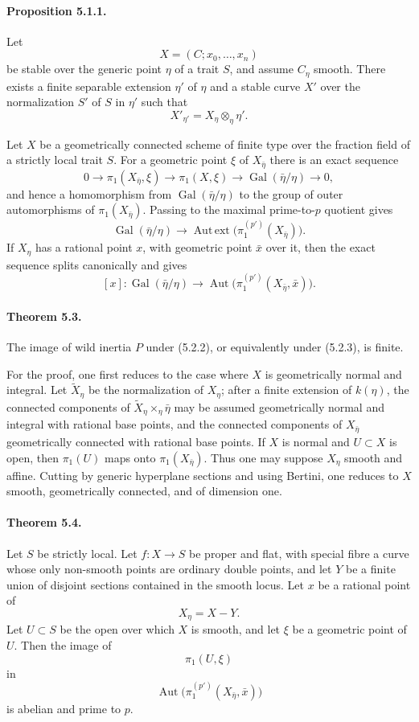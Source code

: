 \documentclass[11pt]{article}
\theoremstyle{plain}
\theoremstyle{definition}
\theoremstyle{remark}
\DeclareMathOperator{\Aut}{Aut}
\DeclareMathOperator{\Gal}{Gal}
\newcommand{\longto}{\longrightarrow}
\newcommand{\Autext}{\operatorname{Aut\,ext}}
\begin{document}
\paragraph{Proposition 5.1.1.}
Let
\[
X=(C;x_0,\ldots,x_n)
\]
be stable over the generic point $\eta$ of a trait $S$, and assume $C_\eta$ smooth. There exists a finite separable extension $\eta'$ of $\eta$ and a stable curve $X'$ over the normalization $S'$ of $S$ in $\eta'$ such that
\[
X'_{\eta'}=X_\eta\otimes_\eta\eta'.
\]

Let $X$ be a geometrically connected scheme of finite type over the fraction field of a strictly local trait $S$. For a geometric point $\xi$ of $X_{\bar\eta}$ there is an exact sequence
\[
0\longto \pi_1(X_{\bar\eta},\xi)\longto
\pi_1(X,\xi)\longto \Gal(\bar\eta/\eta)\longto0,
\tag{5.2.1}
\]
and hence a homomorphism from $\Gal(\bar\eta/\eta)$ to the group of outer automorphisms of $\pi_1(X_{\bar\eta})$. Passing to the maximal prime-to-$p$ quotient gives
\[
\Gal(\bar\eta/\eta)\longto
\Autext\bigl(\pi_1^{(p')}(X_{\bar\eta})\bigr).
\tag{5.2.2}
\]
If $X_\eta$ has a rational point $x$, with geometric point $\bar x$ over it, then the exact sequence splits canonically and gives
\[
[x]:\Gal(\bar\eta/\eta)\longto
\Aut\bigl(\pi_1^{(p')}(X_{\bar\eta},\bar x)\bigr).
\tag{5.2.3}
\]

\paragraph{Theorem 5.3.}
The image of wild inertia $P$ under (5.2.2), or equivalently under (5.2.3), is finite.

For the proof, one first reduces to the case where $X$ is geometrically normal and integral. Let $\widetilde X_\eta$ be the normalization of $X_\eta$; after a finite extension of $k(\eta)$, the connected components of $\widetilde X_\eta\times_\eta\bar\eta$ may be assumed geometrically normal and integral with rational base points, and the connected components of $X_{\bar\eta}$ geometrically connected with rational base points. If $X$ is normal and $U\subset X$ is open, then $\pi_1(U)$ maps onto $\pi_1(X_{\bar\eta})$. Thus one may suppose $X_\eta$ smooth and affine. Cutting by generic hyperplane sections and using Bertini, one reduces to $X$ smooth, geometrically connected, and of dimension one.

\paragraph{Theorem 5.4.}
Let $S$ be strictly local. Let $f:X\to S$ be proper and flat, with special fibre a curve whose only non-smooth points are ordinary double points, and let $Y$ be a finite union of disjoint sections contained in the smooth locus. Let $x$ be a rational point of
\[
X_\eta=X-Y.
\]
Let $U\subset S$ be the open over which $X$ is smooth, and let $\xi$ be a geometric point of $U$. Then the image of
\[
\pi_1(U,\xi)
\]
in
\[
\Aut\bigl(\pi_1^{(p')}(X_{\bar\eta},\bar x)\bigr)
\]
is abelian and prime to $p$.
\end{document}

